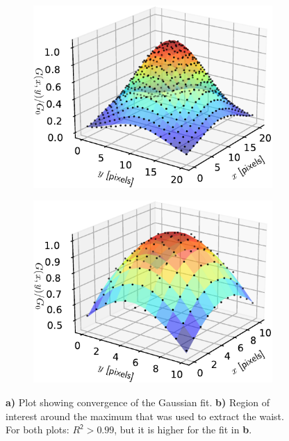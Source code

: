 \begin{figure}
\centering
	\begin{subfigure}{.49\textwidth}
	    \centering
		\includegraphics[width=0.96\linewidth]{figures/3DSpotFitGaussian.pdf}
		\caption{}
		\label{fig:3Dshowing}
	\end{subfigure}
	\begin{subfigure}{.49\textwidth}
		\centering
		\includegraphics[width=0.96\linewidth]{figures/3DSpotFitGaussianSmaller.pdf}
		\caption{}
		\label{fig:3Dwaistfit}
	\end{subfigure}
	\caption{\textbf{a)} Plot showing convergence of the Gaussian fit.
	\textbf{b)} Region of interest around the maximum that was used to extract the waist. For both plots: $\mathsf{\textit{R}^2>0.99}$, but it is higher for the fit in \textbf{b}.}
	\label{fig:3Dfits}
\end{figure}

